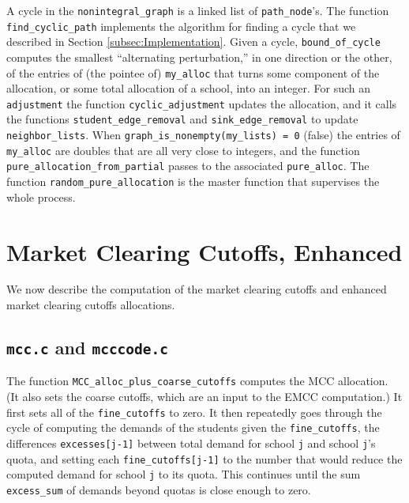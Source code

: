 \documentclass[12pt]{article}
\theoremstyle{definition}
\begin{document}
\begin{appendix}
A cycle in the \texttt{nonintegral\_graph} is a linked list of
\texttt{path\_node}'s.  The function \texttt{find\_cyclic\_path}
implements the algorithm for finding a cycle that we described in
Section \ref{subsec:Implementation}.  Given a cycle,
\texttt{bound\_of\_cycle} computes the smallest ``alternating
perturbation,'' in one direction or the other, of the entries of (the
pointee of) \texttt{my\_alloc} that turns some component of the
allocation, or some total allocation of a school, into an integer.
For such an \texttt{adjustment} the function
\texttt{cyclic\_adjustment} updates the allocation, and it calls the
functions \texttt{student\_edge\_removal} and
\texttt{sink\_edge\_removal} to update \texttt{neighbor\_lists}.
When \texttt{graph\_is\_nonempty(my\_lists) = 0} (false) the entries
of \texttt{my\_alloc} are doubles that are all very close to integers,
and the function \texttt{pure\_allocation\_from\_partial} passes to
the associated \texttt{pure\_alloc}.  The function
\texttt{random\_pure\_allocation} is the master function that
supervises the whole process.

\section{Market Clearing Cutoffs, Enhanced}

We now describe the computation of the market clearing cutoffs and
enhanced market clearing cutoffs allocations.

\subsection{\texttt{mcc.c} and \texttt{mcccode.c}}

The function \texttt{MCC\_alloc\_plus\_coarse\_cutoffs} computes the
MCC allocation.  (It also sets the coarse cutoffs, which are an input
to the EMCC computation.)  It first sets all of the
\texttt{fine\_cutoffs} to zero.  It then repeatedly goes through the
cycle of computing the demands of the students given the
\texttt{fine\_cutoffs}, the differences \texttt{excesses[j-1]} between
total demand for school \texttt{j} and school \texttt{j}'s quota, and
setting each \texttt{fine\_cutoffs[j-1]} to the number that would
reduce the computed demand for school \texttt{j} to its quota.  This
continues until the sum \texttt{excess\_sum} of demands beyond quotas
is close enough to zero.


\end{appendix}
\end{document}
